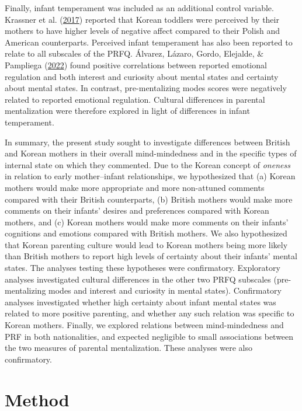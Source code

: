 \documentclass[
]{article}
\begin{document}
Finally, infant temperament was included as an additional control variable. Krassner et al. (\protect\hyperlink{ref-Krassner2017}{2017}) reported that Korean toddlers were perceived by their mothers to have higher levels of negative affect compared to their Polish and American counterparts. Perceived infant temperament has also been reported to relate to all subscales of the PRFQ. Álvarez, Lázaro, Gordo, Elejalde, \& Pampliega (\protect\hyperlink{ref-Alvarez2022}{2022}) found positive correlations between reported emotional regulation and both interest and curiosity about mental states and certainty about mental states. In contrast, pre-mentalizing modes scores were negatively related to reported emotional regulation. Cultural differences in parental mentalization were therefore explored in light of differences in infant temperament.

In summary, the present study sought to investigate differences between British and Korean mothers in their overall mind-mindedness and in the specific types of internal state on which they commented. Due to the Korean concept of \emph{oneness} in relation to early mother--infant relationships, we hypothesized that (a) Korean mothers would make more appropriate and more non-attuned comments compared with their British counterparts, (b) British mothers would make more comments on their infants' desires and preferences compared with Korean mothers, and (c) Korean mothers would make more comments on their infants' cognitions and emotions compared with British mothers. We also hypothesized that Korean parenting culture would lead to Korean mothers being more likely than British mothers to report high levels of certainty about their infants' mental states. The analyses testing these hypotheses were confirmatory. Exploratory analyses investigated cultural differences in the other two PRFQ subscales (pre-mentalizing modes and interest and curiosity in mental states). Confirmatory analyses investigated whether high certainty about infant mental states was related to more positive parenting, and whether any such relation was specific to Korean mothers. Finally, we explored relations between mind-mindedness and PRF in both nationalities, and expected negligible to small associations between the two measures of parental mentalization. These analyses were also confirmatory.

\hypertarget{method}{%
\section*{Method}\label{method}}
\end{document}
